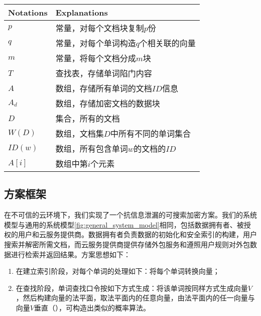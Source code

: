 \begin{tabular}{|| l || l ||}
  \hline
  Notations & Explanations \\
  \hline
  $p$     & 常量，对每个文档块复制$p$份 \\
  $q$     & 常量，对每个单词构造$q$个相关联的向量 \\
  $m$     & 常量，将每个文档分成$m$块 \\
  $T$     & 查找表，存储单词陷门内容 \\
  $A$     & 数组，存储所有单词的文档$ID$信息 \\
  $A_d$   & 数组，存储加密文档的数据块 \\
  $D$     & 集合，所有的文档 \\
  $W(D) $    & 数组，文档集$D$中所有不同的单词集合 \\
  $ID(w)$    & 数组，所有包含单词$w$的文档的$ID$ \\
  $A[i] $    & 数组中第$i$个元素 \\
  \hline
\end{tabular}



\subsection{方案框架}
\label{sec:searchpattern_scheme_description}

在不可信的云环境下，我们实现了一个抗信息泄漏的可搜索加密方案。我们的系统模型与通用的系统模型\ref{fig:general_system_model}相同，包括数据拥有者、被授权的用户和云服务提供商。数据拥有者负责数据的初始化和安全索引的构建，用户搜索并解密所需文档，而云服务提供商提供存储外包服务和遵照用户规则对外包数据进行检索并返回结果。方案思想如下：
\begin{enumerate}
  \item 在建立索引阶段，对每个单词的处理如下：将每个单词转换向量；

  \item 在查找阶段，单词查找口令按如下方式生成：将该单词按同样方式生成向量$V$，然后构建向量的法平面，取法平面内的任意向量，由法平面内的任一向量与向量$V$垂直（），可构造出类似的概率算法。
\end{enumerate}

